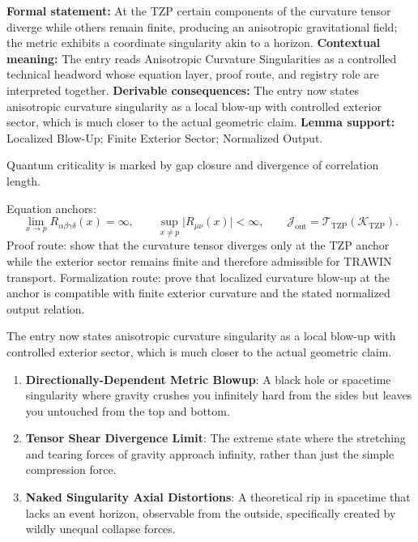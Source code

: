 \begingroup\footnotesize\setlength{\emergencystretch}{3em}\sloppy
\textbf{Formal statement:} At the TZP certain components of the curvature tensor diverge while others remain finite, producing an anisotropic gravitational field; the metric exhibits a coordinate singularity akin to a horizon. \textbf{Contextual meaning:} The entry reads Anisotropic Curvature Singularities as a controlled technical headword whose equation layer, proof route, and registry role are interpreted together. \textbf{Derivable consequences:} The entry now states anisotropic curvature singularity as a local blow-up with controlled exterior sector, which is much closer to the actual geometric claim. \textbf{Lemma support:} Localized Blow-Up; Finite Exterior Sector; Normalized Output.\par
\endgroup

Quantum criticality is marked by gap closure and divergence of correlation length.

Equation anchors:
\[
\lim_{x\to p}R_{\alpha\beta\gamma\delta}(x)=\infty,
\qquad
\sup_{x\ne p}\lvert R_{\mu\nu}(x)\rvert<\infty,
\qquad
\mathcal{J}_{\mathrm{out}}=\mathcal{T}_{\mathrm{TZP}}\!\left(\mathcal{K}_{\mathrm{TZP}}\right).
\]
Proof route: show that the curvature tensor diverges only at the TZP anchor while the exterior sector remains finite and therefore admissible for TRAWIN transport. Formalization route: prove that localized curvature blow-up at the anchor is compatible with finite exterior curvature and the stated normalized output relation.

The entry now states anisotropic curvature singularity as a local blow-up with controlled exterior sector, which is much closer to the actual geometric claim.
\endgroup

\begin{enumerate}[leftmargin=1.6em,itemsep=6pt,topsep=4pt]
\item \textbf{Directionally-Dependent Metric Blowup}: A black hole or spacetime singularity where gravity crushes you infinitely hard from the sides but leaves you untouched from the top and bottom.
\item \textbf{Tensor Shear Divergence Limit}: The extreme state where the stretching and tearing forces of gravity approach infinity, rather than just the simple compression force.
\item \textbf{Naked Singularity Axial Distortions}: A theoretical rip in spacetime that lacks an event horizon, observable from the outside, specifically created by wildly unequal collapse forces.
\end{enumerate}

